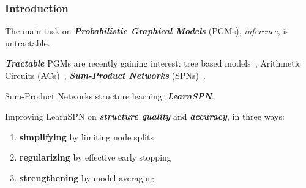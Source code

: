\documentclass[xcolor={usenames,dvipsnames,svgnames}, compress]{beamer}
\begin{document}
{
  \begin{frame}
    \titlepage
  \end{frame}
}



\begin{frame}
  \frametitle{Introduction}
  \footnotesize
  The main task on \emph{\textbf{Probabilistic Graphical Models}} (PGMs), \emph{inference}, is untractable.\par\bigskip
  
  \emph{\textbf{Tractable}} PGMs are recently gaining interest: tree based models~\emph{\parencite{Meila2000}}, Arithmetic Circuits (ACs)~\emph{\parencite{Rooshenas2014-short}},
  \emph{\textbf{Sum-Product Networks}}
  (SPNs)~\emph{\parencite{Poon2011a}}.\par\bigskip

  Sum-Product Networks structure learning: \emph{\textbf{LearnSPN}}.\par\bigskip

  Improving LearnSPN on \emph{\textbf{structure quality}} and \textbf{\emph{accuracy}}, in three ways:
  \begin{enumerate}[I]
  \item \textbf{simplifying} by limiting node splits 
  \item \textbf{regularizing} by effective early stopping
  \item \textbf{strengthening} by model averaging 
  \end{enumerate}
\end{frame}
\end{document}
